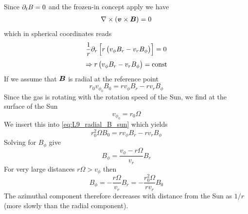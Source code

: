 Since \(\partial_{t}B=0\) and the frozen-in concept apply we have
\begin{eqnarray}
    \nabla\times\left(\boldsymbol{v}\times\boldsymbol{B}\right)=0
\end{eqnarray}
which in spherical coordinates reads
\begin{equation*}
    \frac{1}{r}\partial_{r}\left[r\left(v_\phi B_r-v_{r}B_\phi\right)\right]=0
\end{equation*}
\begin{equation*}
    \Rightarrow r\left(v_\phi B_r-v_{r}B_\phi\right)=\textnormal{const}
\end{equation*}
If we assume that \(\boldsymbol{B}\) is radial at the reference point
\begin{equation}\label{eq:L9_radial_B_sun}
    r_0v_{\phi_0}B_0=rv_\phi B_r-rv_{r}B_\phi
\end{equation}
Since the gas is rotating with the rotation speed of the Sun, we find at the surface of the Sun
\begin{equation*}
    v_{\phi_0}=r_0\Omega
\end{equation*}
We insert this into \cref{eq:L9_radial_B_sun} which yields
\begin{equation*}
    r_0^2\Omega B_0=rv_\phi B_r-rv_{r}B_\phi
\end{equation*}
Solving for \(B_\phi \) give
\begin{equation*}
    B_\phi=\frac{v_\phi-r\Omega}{v_r}B_r
\end{equation*}
For very large distances \(r\Omega > v_\phi \) then
\begin{equation*}
    B_\phi=-\frac{r\Omega}{v_r}B_r=-\frac{r_0^2\Omega}{rv_r}B_0
\end{equation*}
The azimuthal component therefore decreases with distance from the Sun as \(1/r\) (more slowly than the radial component).

